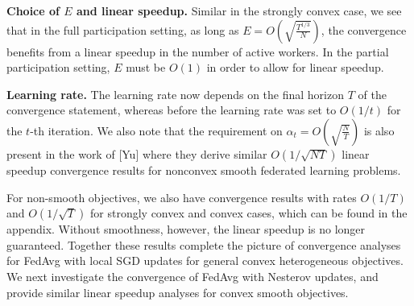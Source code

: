 \begin{remark}
	\textbf{Choice of $E$ and linear speedup. }Similar in the strongly
	convex case, we see that in the full participation setting, as long
	as $E=O(\sqrt{\frac{T^{1/3}}{N}})$, the convergence benefits from
	a linear speedup in the number of active workers. In the partial participation
	setting, $E$ must be $O(1)$ in order to allow for linear speedup.
\end{remark}
%
\begin{remark}
	\textbf{Learning rate. }The learning rate now depends on the final
	horizon $T$ of the convergence statement, whereas before the learning
	rate was set to $O(1/t)$ for the $t$-th iteration. We also note
	that the requirement on $\alpha_{t}=O(\sqrt{\frac{N}{T}})$ is also
	present in the work of {[}Yu{]} where they derive similar $O(1/\sqrt{NT})$
	linear speedup convergence results for nonconvex smooth federated
	learning problems.
\end{remark}
For non-smooth objectives, we also have convergence results with rates
$O(1/T)$ and $O(1/\sqrt{T})$ for strongly convex and convex cases,
which can be found in the appendix. Without smoothness, however, the
linear speedup is no longer guaranteed. Together these results complete
the picture of convergence analyses for FedAvg with local SGD updates
for general convex heterogeneous objectives. We next investigate the
convergence of FedAvg with Nesterov updates, and provide similar linear
speedup analyses for convex smooth objectives. 